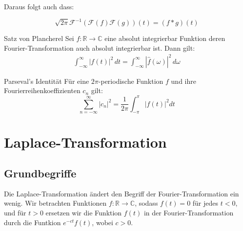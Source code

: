\documentclass[a4paper,10pt]{article}
\begin{document}
Daraus folgt auch dass:

\begin{equation*}
  \sqrt{2\pi}\mathcal{F}^{-1}(\mathcal{F}(f)\mathcal{F}(g))(t)=(f*g)(t)
\end{equation*}

\begin{subbox}{Satz von Plancherel}
  Sei \(f\colon\mathbb{R}\to\mathbb{C}\) eine absolut integrierbar Funktion deren Fourier-Transformation auch absolut integrierbar ist. Dann gilt: \begin{align*} \int_{-\infty}^{\infty} |f(t)|^2 \,dt = \int_{-\infty}^{\infty} |\hat{f}(\omega )|^2\,d\omega \end{align*}
\end{subbox}

\begin{subbox}{Parseval's Identität}
  Für eine $2\pi$-periodische Funktion $f$ und ihre Fourierreihenkoeffizienten $c_n$ gilt:
  $$
    \sum_{n = -\infty}^\infty | c_n |^2 = \frac{1}{2\pi} \int_{-\pi}^\pi |f(t)|^2 dt
  $$
\end{subbox}

\section{Laplace-Transformation}

\subsection{Grundbegriffe}

Die Laplace-Transformation ändert den Begriff der Fourier-Transformation ein wenig. Wir betrachten Funktionen \(f\colon\mathbb{R}\to\mathbb{C}\), sodass \(f(t)=0\) für jedes \(t<0\), und für \(t>0\) ersetzen wir die Funktion \(f(t)\) in der Fourier-Transformation durch die Funtkion \(e^{-ct}f(t)\), wobei \(c>0\).
\end{document}
